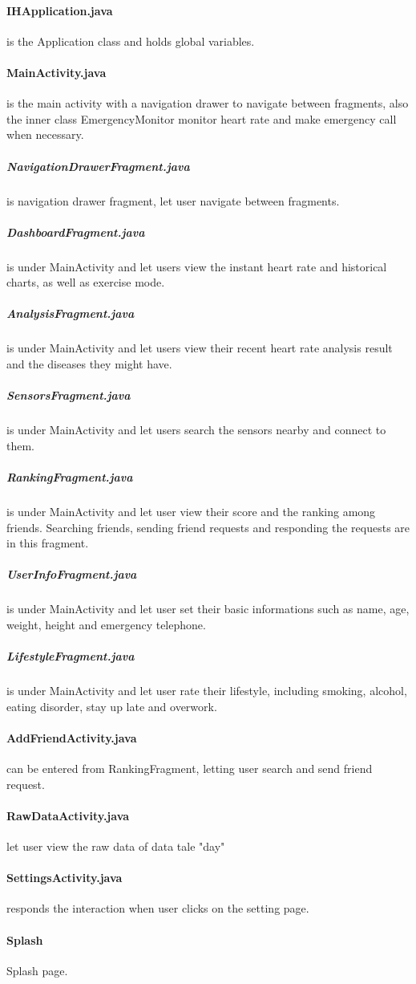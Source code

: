 \documentclass[10pt,a4paper,final]{scrartcl}
\begin{document}
\paragraph{IHApplication.java} is the Application class and holds global variables.
\paragraph{MainActivity.java} is the main activity with a navigation drawer to navigate between fragments, also the inner class EmergencyMonitor monitor heart rate and make emergency call when necessary.
\subparagraph{NavigationDrawerFragment.java} is navigation drawer fragment, let user navigate between fragments.
\subparagraph{DashboardFragment.java} is under MainActivity and let users view the instant heart rate and historical charts, as well as exercise mode.
\subparagraph{AnalysisFragment.java} is under MainActivity and let users view their recent heart rate analysis result  and the diseases they might have.
\subparagraph{SensorsFragment.java} is under MainActivity and let users search the sensors nearby and connect to them.
\subparagraph{RankingFragment.java} is under MainActivity and let user view their score and the ranking among friends. Searching friends, sending friend requests and responding the requests are in this fragment.
\subparagraph{UserInfoFragment.java} is under MainActivity and let user set their basic informations such as name, age, weight, height and emergency telephone.
\subparagraph{LifestyleFragment.java} is under MainActivity and let user rate their lifestyle, including smoking, alcohol, eating disorder, stay up late and overwork.
\paragraph{AddFriendActivity.java} can be entered from RankingFragment, letting user search and send friend request.
\paragraph{RawDataActivity.java} let user view the raw data of data tale "day"
\paragraph{SettingsActivity.java} responds the interaction when user clicks on the setting page.
\paragraph{Splash} Splash page.
\end{document}
